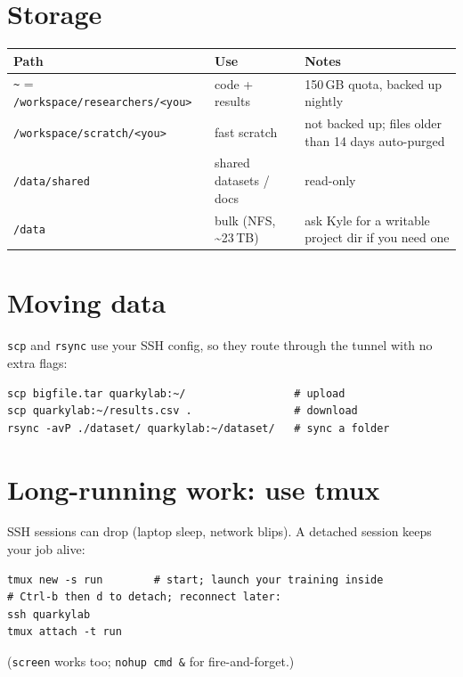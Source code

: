 \documentclass[11pt]{article}
\newcommand{\HomeQuota}{150\,GB}
\newcommand{\code}[1]{\texttt{#1}}
\begin{document}
\section{Storage}
\begin{center}
\begin{tabularx}{\linewidth}{@{}l l X@{}}
\toprule
\textbf{Path} & \textbf{Use} & \textbf{Notes} \\
\midrule
\code{\textasciitilde} = \code{/workspace/researchers/<you>} & code + results & \HomeQuota{} quota, backed up nightly \\
\code{/workspace/scratch/<you>} & fast scratch & not backed up; files older than 14 days auto-purged \\
\code{/data/shared} & shared datasets / docs & read-only \\
\code{/data} & bulk (NFS, \textasciitilde{}23\,TB) & ask Kyle for a writable project dir if you need one \\
\bottomrule
\end{tabularx}
\end{center}

\section{Moving data}
\code{scp} and \code{rsync} use your SSH config, so they route through the tunnel with no extra flags:
\begin{lstlisting}
scp bigfile.tar quarkylab:~/                 # upload
scp quarkylab:~/results.csv .                # download
rsync -avP ./dataset/ quarkylab:~/dataset/   # sync a folder
\end{lstlisting}

\section{Long-running work: use tmux}
SSH sessions can drop (laptop sleep, network blips). A detached session keeps your job alive:
\begin{lstlisting}
tmux new -s run        # start; launch your training inside
# Ctrl-b then d to detach; reconnect later:
ssh quarkylab
tmux attach -t run
\end{lstlisting}
(\code{screen} works too; \code{nohup cmd \&} for fire-and-forget.)
\end{document}
